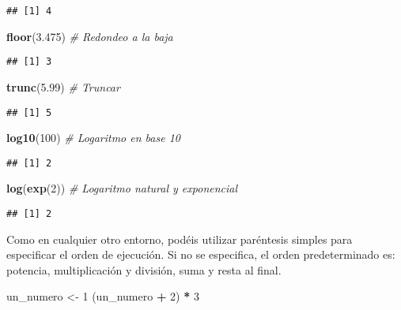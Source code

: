 \documentclass[
]{book}
\newenvironment{Shaded}{\begin{snugshade}}{\end{snugshade}}
\newcommand{\CommentTok}[1]{\textcolor[rgb]{0.56,0.35,0.01}{\textit{#1}}}
\newcommand{\DecValTok}[1]{\textcolor[rgb]{0.00,0.00,0.81}{#1}}
\newcommand{\FloatTok}[1]{\textcolor[rgb]{0.00,0.00,0.81}{#1}}
\newcommand{\KeywordTok}[1]{\textcolor[rgb]{0.13,0.29,0.53}{\textbf{#1}}}
\newcommand{\NormalTok}[1]{#1}
\newcommand{\OperatorTok}[1]{\textcolor[rgb]{0.81,0.36,0.00}{\textbf{#1}}}
\newcommand{\StringTok}[1]{\textcolor[rgb]{0.31,0.60,0.02}{#1}}
\begin{document}
\begin{verbatim}
## [1] 4
\end{verbatim}

\begin{Shaded}
\begin{Highlighting}[]
\KeywordTok{floor}\NormalTok{(}\FloatTok{3.475}\NormalTok{) }\CommentTok{# Redondeo a la baja}
\end{Highlighting}
\end{Shaded}

\begin{verbatim}
## [1] 3
\end{verbatim}

\begin{Shaded}
\begin{Highlighting}[]
\KeywordTok{trunc}\NormalTok{(}\FloatTok{5.99}\NormalTok{) }\CommentTok{# Truncar}
\end{Highlighting}
\end{Shaded}

\begin{verbatim}
## [1] 5
\end{verbatim}

\begin{Shaded}
\begin{Highlighting}[]
\KeywordTok{log10}\NormalTok{(}\DecValTok{100}\NormalTok{) }\CommentTok{# Logaritmo en base 10}
\end{Highlighting}
\end{Shaded}

\begin{verbatim}
## [1] 2
\end{verbatim}

\begin{Shaded}
\begin{Highlighting}[]
\KeywordTok{log}\NormalTok{(}\KeywordTok{exp}\NormalTok{(}\DecValTok{2}\NormalTok{)) }\CommentTok{# Logaritmo natural y exponencial}
\end{Highlighting}
\end{Shaded}

\begin{verbatim}
## [1] 2
\end{verbatim}

Como en cualquier otro entorno, podéis utilizar paréntesis simples para especificar el orden de ejecución. Si no se especifica, el orden predeterminado es: potencia, multiplicación y división, suma y resta al final.

\begin{Shaded}
\begin{Highlighting}[]
\NormalTok{un_numero <-}\StringTok{ }\DecValTok{1}
\NormalTok{(un_numero }\OperatorTok{+}\StringTok{ }\DecValTok{2}\NormalTok{) }\OperatorTok{*}\StringTok{ }\DecValTok{3}
\end{Highlighting}
\end{Shaded}
\end{document}
